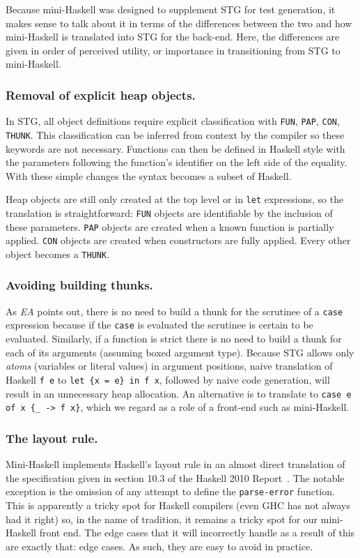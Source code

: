 \documentclass{llncs}
\begin{document}
Because mini-Haskell was designed to supplement STG for test generation, it
makes sense to talk about it in terms of the differences between the two and
how mini-Haskell is translated into STG for the back-end.  Here, the
differences are given in order of perceived utility, or importance in
transitioning from STG to mini-Haskell.

\subsubsection{Removal of explicit heap objects.}
In STG, all object definitions require explicit classification with
\texttt{FUN}, \texttt{PAP}, \texttt{CON}, \texttt{THUNK}. This classification can be
inferred from context by the compiler so these keywords are not necessary.
Functions can then be defined in Haskell style with the parameters following
the function's identifier on the left side of the equality. With these simple
changes the syntax becomes a subset of Haskell.

Heap objects are still only created at the top level or in \texttt{let}
expressions, so the translation is straightforward: \texttt{FUN} objects are
identifiable by the inclusion of these parameters.  \texttt{PAP} objects are
created when a known function is partially applied.  \texttt{CON} objects are
created when constructors are fully applied.  Every other object becomes a
\texttt{THUNK}.

\subsubsection{Avoiding building thunks.}
As \emph{EA} points out, there is no need to build a thunk for the scrutinee
of a \texttt{case} expression because if the \texttt{case} is evaluated the
scrutinee is certain to be evaluated.  Similarly, if a function is strict
there is no need to build a thunk for each of its arguments (assuming boxed
argument type).  Because STG allows only \emph{atoms} (variables or literal
values) in argument positions, naive translation of Haskell \texttt{f e} to
\texttt{let \{x = e\} in f x}, followed by naive code generation, will result in
an unnecessary heap allocation.  An alternative is to translate to
\texttt{case e of x \{\_ -> f x\}}, which we regard as a role of a front-end
such as mini-Haskell.

\subsubsection{The layout rule.}
Mini-Haskell implements Haskell's layout rule in an almost direct translation
of the specification given in section 10.3 of the Haskell 2010
Report~\cite{haskell2010report}. The notable exception is the omission of any
attempt to define the \texttt{parse-error} function.  This is apparently a
tricky spot for Haskell compilers (even GHC has not always had it right) so,
in the name of tradition, it remains a tricky spot for our mini-Haskell front
end.  The edge cases that it will incorrectly handle as a result of this are
exactly that: edge cases.  As such, they are easy to avoid in practice.
\end{document}
